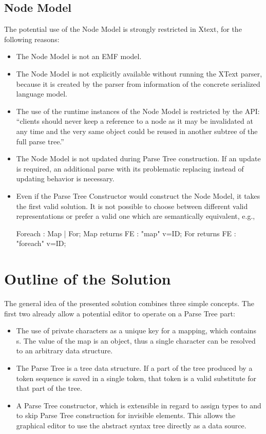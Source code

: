 \subsection{Node Model}
The potential use of the Node Model is strongly restricted in Xtext, for the following reasons:
\begin{itemize}
	\item The Node Model is not an EMF model. 
	\item The Node Model is not explicitly available without running the XText parser, because it is created by the parser from information of the concrete serialized language model. 
	\item The use of the runtime instances of the Node Model is restricted by the API: ``clients should never keep a reference to a node as it may be invalidated at any time and the very same object could be reused in another subtree of the full parse tree.''\cite{XTextAPI}
	\item The Node Model is not updated during Parse Tree construction. If an update is required, an additional parse with its problematic replacing instead of updating behavior is necessary.
	\item Even if the Parse Tree Constructor would construct the Node Model, it takes the first valid solution. It is not possible to choose between different valid representations or prefer a valid one which are semantically equivalent, e.g.,
\begin{xtxt}
Foreach 		: 	Map | For;
Map returns FE  	:  	"map" 		v=ID;
For returns FE  	: 	"foreach"	v=ID;
\end{xtxt}
\end{itemize}


\section{Outline of the Solution}
The general idea of the presented solution combines three simple concepts. The first two already allow a potential editor to operate on a Parse Tree part:
\begin{itemize}
	\item The use of private characters as a unique key for a mapping, which contains s. The value of the map is an object, thus a single character can be resolved to an arbitrary data structure.
	\item The Parse Tree is a tree data structure. If a part of the tree produced by a token sequence is saved in a single token, that token is a valid substitute for that part of the tree.
	\item A Parse Tree constructor, which is extensible in regard to assign types to and to skip Parse Tree construction for invisible elements. This allows the graphical editor to use the abstract syntax tree directly as a data source. 
\end{itemize}

